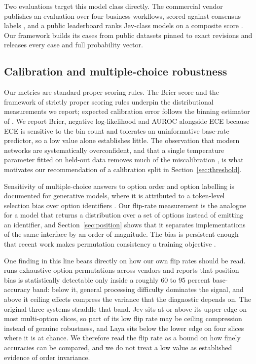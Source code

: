 Two evaluations target this model class directly. The commercial vendor
publishes an evaluation over four business workflows, scored against consensus
labels \citep{typesafe2026evals}, and a public leaderboard ranks Jev-class
models on a composite score \citep{standhartinger2026jevbench}. Our framework
builds its cases from public datasets pinned to exact revisions and releases
every case and full probability vector.

\subsection{Calibration and multiple-choice robustness}

Our metrics are standard proper scoring rules. The Brier score
\citep{brier1950} and the framework of strictly proper scoring rules
\citep{gneiting2007scoring} underpin the distributional measurements we report;
expected calibration error follows the binning estimator of
\citet{naeini2015ece}. We report Brier, negative log-likelihood and AUROC
alongside ECE because ECE is sensitive to the bin count and tolerates an
uninformative base-rate predictor, so a low value alone establishes little. The
observation that modern networks are systematically overconfident, and that a
single temperature parameter fitted on held-out data removes much of the
miscalibration \citep{guo2017calibration}, is what motivates our recommendation
of a calibration split in Section~\ref{sec:threshold}.

Sensitivity of multiple-choice answers to option order and option labelling is
documented for generative models, where it is attributed to a token-level
selection bias over option identifiers \citep{zheng2024mcqbias}. Our flip-rate
measurement is the analogue for a model that returns a distribution over a set of
options instead of emitting an identifier, and Section~\ref{sec:position} shows
that it separates implementations of the same interface by an order of magnitude.
The bias is persistent enough that recent work makes permutation consistency a
training objective \citep{zheng2026pagrpo}.

One finding in this line bears directly on how our own flip rates should be read.
\citet{tamba2026positionbias} runs exhaustive option permutations across vendors
and reports that position bias is statistically detectable only inside a roughly
60 to 95 percent base-accuracy band: below it, general processing difficulty
dominates the signal, and above it ceiling effects compress the variance that the
diagnostic depends on. The original three systems straddle that band. Jev sits at or above
its upper edge on most multi-option slices, so part of its low flip rate may be
ceiling compression instead of genuine robustness, and Laya sits below the lower
edge on four slices where it is at chance. We therefore read the flip rate as a
bound on how finely accuracies can be compared, and we do not treat a low value
as established evidence of order invariance.
